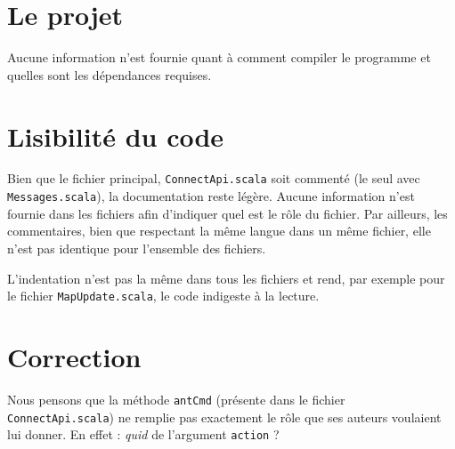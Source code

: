 \documentclass[a4paper, 12pt]{article}
\begin{document}
\section*{Le projet}
Aucune information n'est fournie quant à comment compiler le programme et quelles
 sont les dépendances requises.

\section*{Lisibilité du code}
Bien que le fichier principal, \verb+ConnectApi.scala+ soit commenté (le seul
 avec \verb+Messages.scala+), la documentation reste légère. Aucune information
 n'est fournie dans les fichiers afin d'indiquer quel est le rôle du fichier. Par
 ailleurs, les commentaires, bien que respectant la même langue dans un même
 fichier, elle n'est pas identique pour l'ensemble des fichiers.

L'indentation n'est pas la même dans tous les fichiers et rend, par exemple pour
 le fichier \verb+MapUpdate.scala+, le code indigeste à la lecture.

\section*{Correction}
Nous pensons que la méthode \verb+antCmd+ (présente dans le fichier
 \verb+ConnectApi.scala+) ne remplie pas exactement le rôle que ses auteurs
 voulaient lui donner. En effet : \textit{quid} de l'argument \verb+action+ ?
\end{document}
